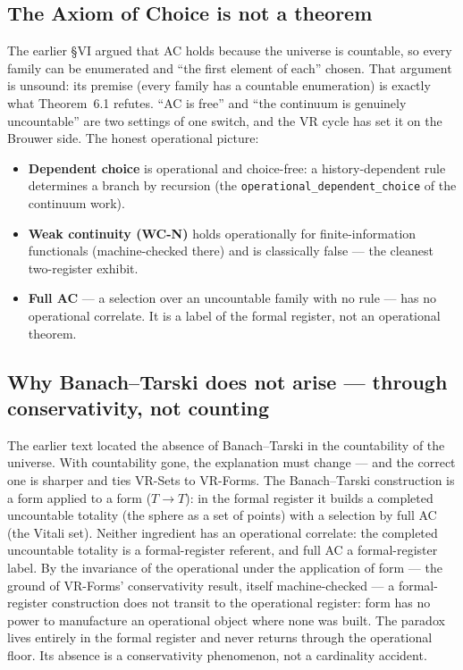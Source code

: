 \documentclass[11pt]{article}
\theoremstyle{remark}
\begin{document}
\subsection{The Axiom of Choice is not a theorem}
The earlier \S VI argued that AC holds because the universe is countable, so every family can be
enumerated and ``the first element of each'' chosen. That argument is unsound: its premise (every
family has a countable enumeration) is exactly what Theorem~6.1 refutes. ``AC is free'' and ``the
continuum is genuinely uncountable'' are two settings of one switch, and the VR cycle has set it on
the Brouwer side. The honest operational picture:
\begin{itemize}
\item \textbf{Dependent choice} is operational and choice-free: a history-dependent rule determines a
branch by recursion (the \texttt{operational\_dependent\_choice} of the continuum work).
\item \textbf{Weak continuity (WC-N)} holds operationally for finite-information functionals
(machine-checked there) and is classically false --- the cleanest two-register exhibit.
\item \textbf{Full AC} --- a selection over an uncountable family with no rule --- has no operational
correlate. It is a label of the formal register, not an operational theorem.
\end{itemize}

\subsection{Why Banach--Tarski does not arise --- through conservativity, not counting}
The earlier text located the absence of Banach--Tarski in the countability of the universe. With
countability gone, the explanation must change --- and the correct one is sharper and ties VR-Sets to
VR-Forms. The Banach--Tarski construction is a form applied to a form ($T\to T$): in the formal
register it builds a completed uncountable totality (the sphere as a set of points) with a selection
by full AC (the Vitali set). Neither ingredient has an operational correlate: the completed
uncountable totality is a formal-register referent, and full AC a formal-register label. By the
invariance of the operational under the application of form --- the ground of VR-Forms'
conservativity result, itself machine-checked --- a formal-register construction does not transit to
the operational register: form has no power to manufacture an operational object where none was
built. The paradox lives entirely in the formal register and never returns through the operational
floor. Its absence is a conservativity phenomenon, not a cardinality accident.
\end{document}
